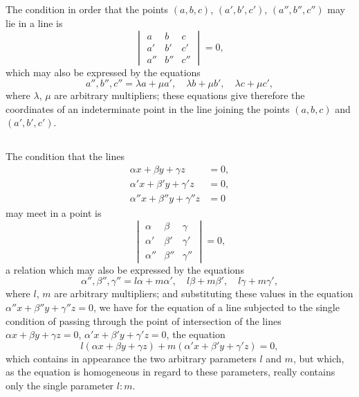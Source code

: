 \documentclass[11pt,a4paper]{book}
\begin{document}
\begin{center}
\subsection{}

The condition in order that the points $(a, b, c)$, $(a', b', c')$, $(a'', b'', c'')$ may lie in a line is
\[
\begin{vmatrix}
a & b & c \\
a' & b' & c' \\
a'' & b'' & c''
\end{vmatrix} = 0,
\]
which may also be expressed by the equations
\[
a'', b'', c'' = \lambda a + \mu a', \quad \lambda b + \mu b', \quad \lambda c + \mu c',
\]
where $\lambda$, $\mu$ are arbitrary multipliers; these equations give therefore the coordinates of an indeterminate point in the line joining the points $(a, b, c)$ and $(a', b', c')$.

\subsection{}

The condition that the lines
\begin{align*}
\alpha x + \beta y + \gamma z &= 0,\\
\alpha' x + \beta' y + \gamma' z &= 0,\\
\alpha'' x + \beta'' y + \gamma'' z &= 0
\end{align*}
may meet in a point is
\[
\begin{vmatrix}
\alpha & \beta & \gamma \\
\alpha' & \beta' & \gamma' \\
\alpha'' & \beta'' & \gamma''
\end{vmatrix} = 0,
\]
a relation which may also be expressed by the equations
\[
\alpha'', \beta'', \gamma'' = l\alpha + m\alpha', \quad l\beta + m\beta', \quad l\gamma + m\gamma',
\]
where $l$, $m$ are arbitrary multipliers; and substituting these values in the equation $\alpha'' x + \beta'' y + \gamma'' z = 0$, we have for the equation of a line subjected to the single condition of passing through the point of intersection of the lines $\alpha x + \beta y + \gamma z = 0$, $\alpha' x + \beta' y + \gamma' z = 0$, the equation
\[
l(\alpha x + \beta y + \gamma z) + m(\alpha' x + \beta' y + \gamma' z) = 0,
\]
which contains in appearance the two arbitrary parameters $l$ and $m$, but which, as the equation is homogeneous in regard to these parameters, really contains only the single parameter $l : m$.
\clearpage



\end{center}
\end{document}
